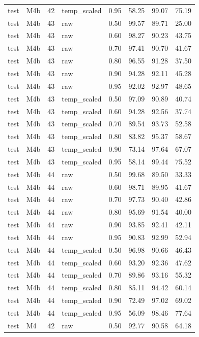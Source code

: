 \begin{tabular}{llrlrrrr}
test & M4b & 42 & temp\_scaled & 0.95 & 58.25 & 99.07 & 75.19 \\
test & M4b & 43 & raw & 0.50 & 99.57 & 89.71 & 25.00 \\
test & M4b & 43 & raw & 0.60 & 98.27 & 90.23 & 43.75 \\
test & M4b & 43 & raw & 0.70 & 97.41 & 90.70 & 41.67 \\
test & M4b & 43 & raw & 0.80 & 96.55 & 91.28 & 37.50 \\
test & M4b & 43 & raw & 0.90 & 94.28 & 92.11 & 45.28 \\
test & M4b & 43 & raw & 0.95 & 92.02 & 92.97 & 48.65 \\
test & M4b & 43 & temp\_scaled & 0.50 & 97.09 & 90.89 & 40.74 \\
test & M4b & 43 & temp\_scaled & 0.60 & 94.28 & 92.56 & 37.74 \\
test & M4b & 43 & temp\_scaled & 0.70 & 89.54 & 93.73 & 52.58 \\
test & M4b & 43 & temp\_scaled & 0.80 & 83.82 & 95.37 & 58.67 \\
test & M4b & 43 & temp\_scaled & 0.90 & 73.14 & 97.64 & 67.07 \\
test & M4b & 43 & temp\_scaled & 0.95 & 58.14 & 99.44 & 75.52 \\
test & M4b & 44 & raw & 0.50 & 99.68 & 89.50 & 33.33 \\
test & M4b & 44 & raw & 0.60 & 98.71 & 89.95 & 41.67 \\
test & M4b & 44 & raw & 0.70 & 97.73 & 90.40 & 42.86 \\
test & M4b & 44 & raw & 0.80 & 95.69 & 91.54 & 40.00 \\
test & M4b & 44 & raw & 0.90 & 93.85 & 92.41 & 42.11 \\
test & M4b & 44 & raw & 0.95 & 90.83 & 92.99 & 52.94 \\
test & M4b & 44 & temp\_scaled & 0.50 & 96.98 & 90.66 & 46.43 \\
test & M4b & 44 & temp\_scaled & 0.60 & 93.20 & 92.36 & 47.62 \\
test & M4b & 44 & temp\_scaled & 0.70 & 89.86 & 93.16 & 55.32 \\
test & M4b & 44 & temp\_scaled & 0.80 & 85.11 & 94.42 & 60.14 \\
test & M4b & 44 & temp\_scaled & 0.90 & 72.49 & 97.02 & 69.02 \\
test & M4b & 44 & temp\_scaled & 0.95 & 56.09 & 98.46 & 77.64 \\
test & M4 & 42 & raw & 0.50 & 92.77 & 90.58 & 64.18 \\

\end{tabular}
